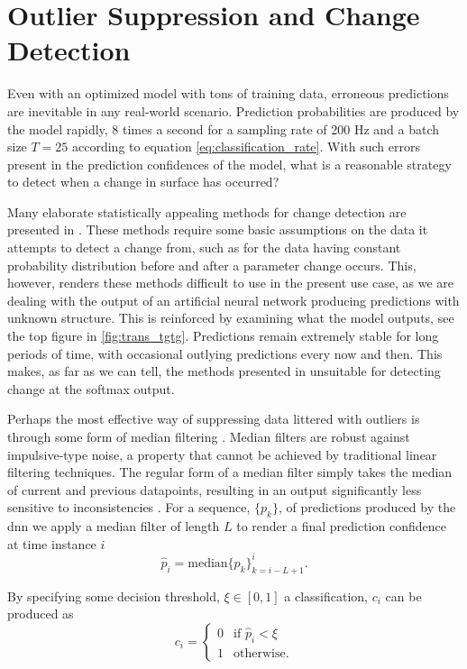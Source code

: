 \section{Outlier Suppression and Change Detection}

\label{surface_change}
Even with an optimized model with tons of training data, erroneous predictions are inevitable in any real-world scenario. Prediction probabilities are produced by the model rapidly, 8 times a second for a sampling rate of 200 Hz and a batch size $T=25$ according to equation \eqref{eq:classification_rate}. With such errors present in the prediction confidences of the model, what is a reasonable strategy to detect when a change in surface has occurred?  

Many elaborate statistically appealing methods for change detection are presented in \citep{basseville_nikiforov_1993}. These methods require some basic assumptions on the data it attempts to detect a change from, such as for the data having constant probability distribution before and after a parameter change occurs. This, however, renders these methods difficult to use in the present use case, as we are dealing with the output of an artificial neural network producing predictions with unknown structure. This is reinforced by examining what the model outputs, see the top figure in \ref{fig:trans_tgtg}. Predictions remain extremely stable for long periods of time, with occasional outlying predictions every now and then. This makes, as far as we can tell, the methods presented in \citep{basseville_nikiforov_1993} unsuitable for detecting change at the softmax output.

Perhaps the most effective way of suppressing data littered with outliers is through some form of median filtering \citep{yin_yang_gabbouj_neuvo_1996}. Median filters are robust against impulsive-type noise, a property that cannot be achieved by traditional linear filtering techniques. The regular form of a median filter simply takes the median of current and previous datapoints, resulting in an output significantly less sensitive to inconsistencies \citep{pearson_2002}. For a sequence, $\{p_k\}$, of predictions produced by the \gls{dnn} we apply a median filter of length $L$ to render a final prediction confidence at time instance $i$
\citep{yin_yang_gabbouj_neuvo_1996}
\begin{equation}
	\hat{p}_i=\text{median}\{p_k\}_{k=i-L+1}^i.
\end{equation}

By specifying some decision threshold, $\xi\in [0,1]$ a classification, $c_i$ can be produced as
\begin{equation}
	c_i = \begin{cases}
		0 & \text{if $\hat{p}_i<\xi$} \\
		1 & \text{otherwise}.
	\end{cases}
\end{equation}

